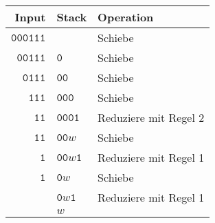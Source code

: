 \begin{center}
\begin{tabular}{|r|l|l|}
\hline
Input&Stack&Operation\\
\hline
$\texttt{000111}$&&Schiebe\\
$\texttt{00111}$&$\texttt{0}$&Schiebe\\
$\texttt{0111}$&$\texttt{00}$&Schiebe\\
$\texttt{111}$&$\texttt{000}$&Schiebe\\
$\texttt{11}$&$\texttt{0001}$&Reduziere mit Regel 2\\
$\texttt{11}$&$\texttt{00}w$&Schiebe\\
$\texttt{1}$&$\texttt{00}w\texttt{1}$&Reduziere mit Regel 1\\
$\texttt{1}$&$\texttt{0}w$&Schiebe\\
&$\texttt{0}w\texttt{1}$&Reduziere mit Regel 1\\
&$w$&\\
\hline
\end{tabular}
\end{center}
